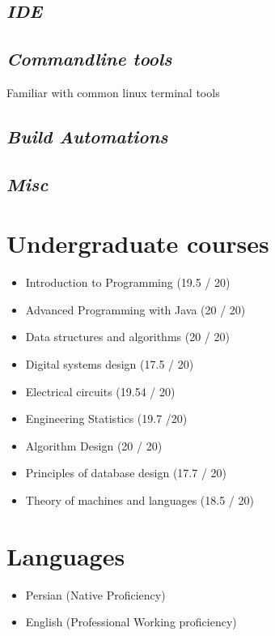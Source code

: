 \documentclass[11pt,a4paper,sans]{moderncv}
\begin{document}
    \subsection{\textit{IDE}}

    \subsection{\textit{Commandline tools}}
        {Familiar with common linux terminal tools}

    \subsection{\textit{Build Automations}}

    \subsection{\textit{Misc}}

\section{ Undergraduate courses}
\begin{itemize}
    \item Introduction to Programming (19.5 / 20)
    \item Advanced Programming with Java (20 / 20)
    \item Data structures and algorithms (20 / 20)
    \item Digital systems design (17.5 / 20)
    \item Electrical circuits (19.54 / 20)
    \item Engineering Statistics (19.7 /20)
    \item Algorithm Design (20 / 20)
    \item Principles of database design (17.7 / 20)
    \item Theory of machines and languages (18.5 / 20)
\end{itemize}
\section{ Languages}
\begin{itemize}
    \item Persian (Native Proficiency)
    \item English (Professional Working proficiency)
\end{itemize}
\end{document}
